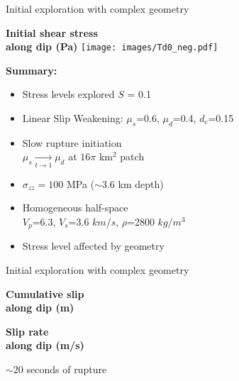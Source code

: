 \documentclass{beamer}
\begin{document}
\begin{frame}
 {Initial exploration with complex geometry}
 
 \begin{minipage}{0.45\linewidth}
 \begin{center}
  {\bf Initial shear stress \\ along dip (Pa)}
  \texttt{[image: images/Td0\_neg.pdf]}  
 \end{center}
 \end{minipage}
 \begin{minipage}{0.53\linewidth}
 {\bf Summary:}
 \vskip 0.3cm
 \begin{itemize}
  \small \item \small Stress levels explored $S$ = 0.1
  \vskip 0.3cm
  \item \small Linear Slip Weakening: $\mu_s$=0.6, 
  $\mu_d$=0.4, $d_c$=0.15
  \vskip 0.3cm
  \item \small Slow rupture initiation \\ $\mu_s \xrightarrow[t \to 1] \ \mu_d$ at $16\pi$ km$^2$ patch
  \vskip 0.3cm
  \item \small $\sigma_{zz}=100$ MPa ($\sim$3.6 km depth)
  \vskip 0.3cm
  \item \small Homogeneous half-space \\ \scriptsize $V_p$=6.3, $V_s$=3.6 $km/s$, $\rho$=2800 $kg/m^3$   \vskip 0.3cm
  \item \small Stress level affected by geometry \end{itemize}
 \end{minipage}

\end{frame}


\begin{frame}
 {Initial exploration with complex geometry}
 
 \begin{minipage}{0.45\linewidth}
 \begin{center}
  {\bf Cumulative slip \\ along dip (m)}
 \end{center}
 \end{minipage}
 \begin{minipage}{0.45\linewidth}
 \begin{center}
 {\bf Slip rate \\ along dip (m/s)}
 \end{center}
 \end{minipage}
 
 \begin{center}
  $\sim$20 seconds of rupture
 \end{center}

 
\end{frame}
\end{document}
